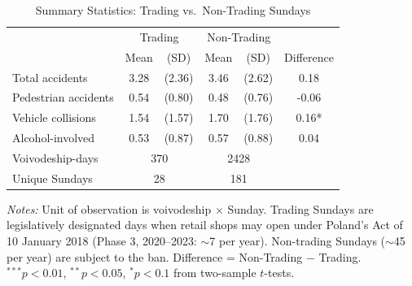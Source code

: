\begin{table}[htbp]
\centering
\caption{Summary Statistics: Trading vs.~Non-Trading Sundays}
\label{tab:summary}
\begin{tabular}{lccccc}
\hline\hline
 & \multicolumn{2}{c}{Trading} & \multicolumn{2}{c}{Non-Trading} & \\
 & Mean & (SD) & Mean & (SD) & Difference \\
\hline
  Total accidents & 3.28 & (2.36) & 3.46 & (2.62) & 0.18 \\
  Pedestrian accidents & 0.54 & (0.80) & 0.48 & (0.76) & -0.06 \\
  Vehicle collisions & 1.54 & (1.57) & 1.70 & (1.76) & 0.16* \\
  Alcohol-involved & 0.53 & (0.87) & 0.57 & (0.88) & 0.04 \\
\hline
  Voivodeship-days & \multicolumn{2}{c}{370} & \multicolumn{2}{c}{2428} & \\
  Unique Sundays & \multicolumn{2}{c}{28} & \multicolumn{2}{c}{181} & \\
\hline\hline
\end{tabular}
\begin{tablenotes}[flushleft]
\small
\item \textit{Notes:} Unit of observation is voivodeship $\times$ Sunday. Trading Sundays are legislatively designated days when retail shops may open under Poland's Act of 10 January 2018 (Phase 3, 2020--2023: $\sim$7 per year). Non-trading Sundays ($\sim$45 per year) are subject to the ban. Difference = Non-Trading $-$ Trading. $^{***}p<0.01$, $^{**}p<0.05$, $^{*}p<0.1$ from two-sample $t$-tests.
\end{tablenotes}
\end{table}

